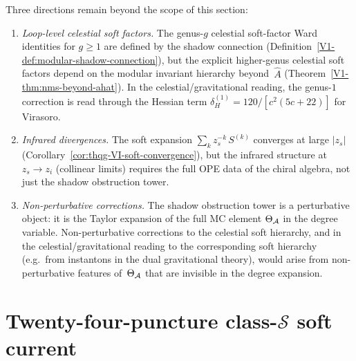 \begin{remark}
Three directions remain beyond the scope of this section:
\begin{enumerate}[label=\textup{(\roman*)}]
\item \emph{Loop-level celestial soft factors.} The genus-$g$ celestial
 soft-factor Ward identities for $g \geq 1$ are defined by the shadow
 connection (Definition~\ref{V1-def:modular-shadow-connection}),
 but the explicit higher-genus celestial soft factors depend on
 the modular invariant hierarchy
 beyond~$\hat{A}$ (Theorem~\ref{V1-thm:nms-beyond-ahat}).
 In the celestial/gravitational reading, the genus-$1$ correction is
 read through the Hessian term
 $\delta_H^{(1)} = 120/[c^2(5c+22)]$ for Virasoro.
\item \emph{Infrared divergences.} The soft expansion
 $\sum_k z_s^{-k}\,S^{(k)}$ converges at large $|z_s|$
 (Corollary~\ref{cor:thqg-VI-soft-convergence}), but the
 infrared structure at $z_s \to z_i$ (collinear limits)
 requires the full OPE data of the chiral algebra, not
 just the shadow obstruction tower.
\item \emph{Non-perturbative corrections.} The shadow
 obstruction tower is a perturbative object: it is the
 Taylor expansion of the full MC element
 $\Theta_{\mathcal{A}}$ in the degree variable. Non-perturbative
 corrections to the celestial soft hierarchy, and in the
 celestial/gravitational reading to the corresponding soft
 hierarchy (e.g.\ from instantons in the dual gravitational theory),
 would arise from
 non-perturbative features of~$\Theta_{\mathcal{A}}$ that are invisible
 in the degree expansion.
\end{enumerate}
\end{remark}

\section{Twenty-four-puncture class-\texorpdfstring{$\mathcal S$}{S} soft current}
\label{sec:softgrav-supplement}

